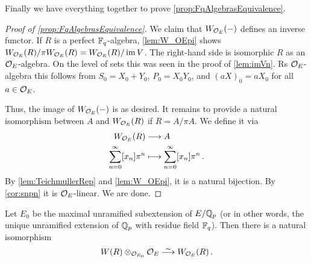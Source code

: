 Finally we have everything together to prove \cref{prop:FqAlgebrasEquivalence}.
\begin{proof}[Proof of \cref{prop:FqAlgebrasEquivalence}]
	We claim that $W_{\mathcal{O}_E}(-)$ defines an inverse functor. If $R$ is a perfect $\mathbb{F}_q$-algebra, \cref{lem:W_OEpi} shows $W_{\mathcal{O}_E}(R)/\pi W_{\mathcal{O}_E}(R)= W_{\mathcal{O}_E}(R)/\operatorname{im} V$. The right-hand side is isomorphic $R$ as an $\mathcal{O}_E$-algebra. On the level of sets this was seen in the proof of \cref{lem:imVn}. Rs $\mathcal{O}_E$-algebra this follows from $S_0=X_0+Y_0$, $P_0=X_0Y_0$, and $(aX)_0=aX_0$ for all $a\in\mathcal{O}_E$.
	
	Thus, the image of $W_{\mathcal{O}_E}(-)$ is as desired. It remains to provide a natural isomorphism between $A$ and $W_{\mathcal{O}_E}(R)$ if $R=A/\pi A$. We define it via
	\begin{align*}
		W_{\Oo_E}(R)&\morphism A\\
		\sum_{n=0}^\infty[x_n]\pi^n&\longmapsto\sum_{n=0}^\infty[x_n]\pi^n\,.
	\end{align*}
	By \cref{lem:TeichmullerRep} and \cref{lem:W_OEpi}, it is a natural bijection. By \cref{cor:snpn} it is $\mathcal{O}_E$-linear. We are done.
\end{proof}
\begin{cor}\label{cor:unramifiedWitt}
	Let $E_0$ be the maximal unramified subextension of $E/\mathbb{Q}_p$ (or in other words, the unique unramified extension of $\mathbb{Q}_p$ with residue field $\mathbb{F}_q$). Then there is a natural isomorphism
	\begin{equation*}
		W(R)\otimes_{\Oo_{E_0}}\Oo_E\isomorphism W_{\Oo_E}(R)\,.
	\end{equation*}
\end{cor}
